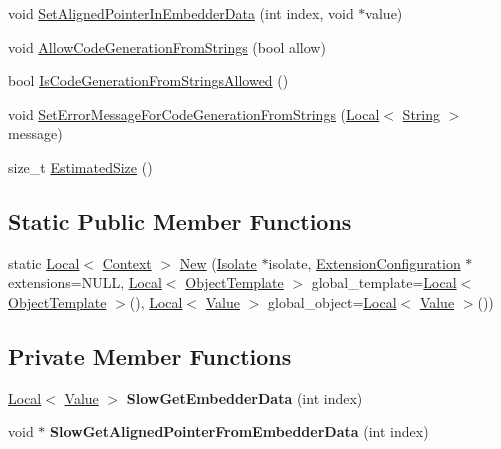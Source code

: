 \begin{DoxyCompactItemize}
void \hyperlink{classv8_1_1_context_a522063c88e4c2832f5ff4f3980815f58}{Set\+Aligned\+Pointer\+In\+Embedder\+Data} (int index, void $\ast$value)
\item 
void \hyperlink{classv8_1_1_context_a794ccc42113566f5d363f89c8b0d3c2c}{Allow\+Code\+Generation\+From\+Strings} (bool allow)
\item 
bool \hyperlink{classv8_1_1_context_aa7a960a232d232d1a2a904c2e6c18831}{Is\+Code\+Generation\+From\+Strings\+Allowed} ()
\item 
void \hyperlink{classv8_1_1_context_a8c919ccddb6fbb65602f7fe2587e8a34}{Set\+Error\+Message\+For\+Code\+Generation\+From\+Strings} (\hyperlink{classv8_1_1_local}{Local}$<$ \hyperlink{classv8_1_1_string}{String} $>$ message)
\item 
size\+\_\+t \hyperlink{classv8_1_1_context_abfec90cb6cb1cac58b4e3487515721a2}{Estimated\+Size} ()
\end{DoxyCompactItemize}
\subsection*{Static Public Member Functions}
\begin{DoxyCompactItemize}
\item 
static \hyperlink{classv8_1_1_local}{Local}$<$ \hyperlink{classv8_1_1_context}{Context} $>$ \hyperlink{classv8_1_1_context_aee22d1422b0804b5b6bc0646bfd29af8}{New} (\hyperlink{classv8_1_1_isolate}{Isolate} $\ast$isolate, \hyperlink{classv8_1_1_extension_configuration}{Extension\+Configuration} $\ast$extensions=N\+U\+LL, \hyperlink{classv8_1_1_local}{Local}$<$ \hyperlink{classv8_1_1_object_template}{Object\+Template} $>$ global\+\_\+template=\hyperlink{classv8_1_1_local}{Local}$<$ \hyperlink{classv8_1_1_object_template}{Object\+Template} $>$(), \hyperlink{classv8_1_1_local}{Local}$<$ \hyperlink{classv8_1_1_value}{Value} $>$ global\+\_\+object=\hyperlink{classv8_1_1_local}{Local}$<$ \hyperlink{classv8_1_1_value}{Value} $>$())
\end{DoxyCompactItemize}
\subsection*{Private Member Functions}
\begin{DoxyCompactItemize}
\item 
\hyperlink{classv8_1_1_local}{Local}$<$ \hyperlink{classv8_1_1_value}{Value} $>$ {\bfseries Slow\+Get\+Embedder\+Data} (int index)\hypertarget{classv8_1_1_context_a5c27c14fa755c7430e54ae864e329011}{}\label{classv8_1_1_context_a5c27c14fa755c7430e54ae864e329011}

\item 
void $\ast$ {\bfseries Slow\+Get\+Aligned\+Pointer\+From\+Embedder\+Data} (int index)\hypertarget{classv8_1_1_context_ae79782ecf2b811fa20ceb735059842d5}{}\label{classv8_1_1_context_ae79782ecf2b811fa20ceb735059842d5}

\end{DoxyCompactItemize}
